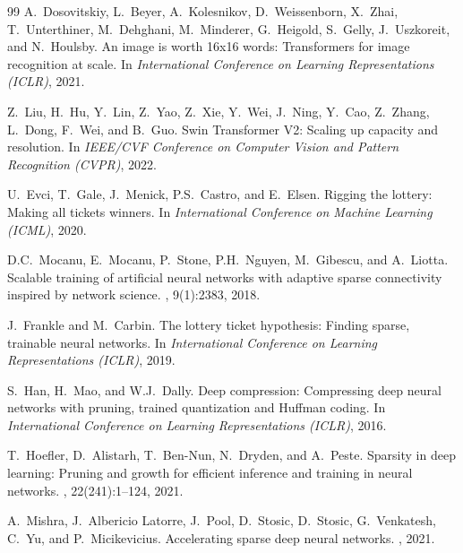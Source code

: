 \documentclass[letterpaper]{article} %
\begin{document}
\begin{thebibliography}{99}
A.~Dosovitskiy, L.~Beyer, A.~Kolesnikov, D.~Weissenborn, X.~Zhai, T.~Unterthiner, M.~Dehghani, M.~Minderer, G.~Heigold, S.~Gelly, J.~Uszkoreit, and N.~Houlsby.
\newblock An image is worth 16x16 words: Transformers for image recognition at scale.
\newblock In {\em International Conference on Learning Representations (ICLR)}, 2021.

Z.~Liu, H.~Hu, Y.~Lin, Z.~Yao, Z.~Xie, Y.~Wei, J.~Ning, Y.~Cao, Z.~Zhang, L.~Dong, F.~Wei, and B.~Guo.
\newblock Swin Transformer V2: Scaling up capacity and resolution.
\newblock In {\em IEEE/CVF Conference on Computer Vision and Pattern Recognition (CVPR)}, 2022.


U.~Evci, T.~Gale, J.~Menick, P.S.~Castro, and E.~Elsen.
\newblock Rigging the lottery: Making all tickets winners.
\newblock In {\em International Conference on Machine Learning (ICML)}, 2020.

D.C.~Mocanu, E.~Mocanu, P.~Stone, P.H.~Nguyen, M.~Gibescu, and A.~Liotta.
\newblock Scalable training of artificial neural networks with adaptive sparse connectivity inspired by network science.
, 9(1):2383, 2018.

J.~Frankle and M.~Carbin.
\newblock The lottery ticket hypothesis: Finding sparse, trainable neural networks.
\newblock In {\em International Conference on Learning Representations (ICLR)}, 2019.

S.~Han, H.~Mao, and W.J.~Dally.
\newblock Deep compression: Compressing deep neural networks with pruning, trained quantization and Huffman coding.
\newblock In {\em International Conference on Learning Representations (ICLR)}, 2016.

T.~Hoefler, D.~Alistarh, T.~Ben-Nun, N.~Dryden, and A.~Peste.
\newblock Sparsity in deep learning: Pruning and growth for efficient inference and training in neural networks.
, 22(241):1--124, 2021.


A.~Mishra, J.~Albericio Latorre, J.~Pool, D.~Stosic, D.~Stosic, G.~Venkatesh, C.~Yu, and P.~Micikevicius.
\newblock Accelerating sparse deep neural networks.
, 2021.


\end{thebibliography}
\end{document}
